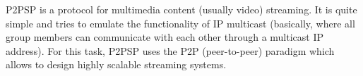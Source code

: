 P2PSP is a protocol for multimedia content (usually video)
streaming. It is quite simple and tries to emulate the functionality
of IP multicast (basically, where all group members can communicate
with each other through a multicast IP address). For this task, P2PSP
uses the P2P (peer-to-peer) paradigm which allows to design highly
scalable streaming systems.
